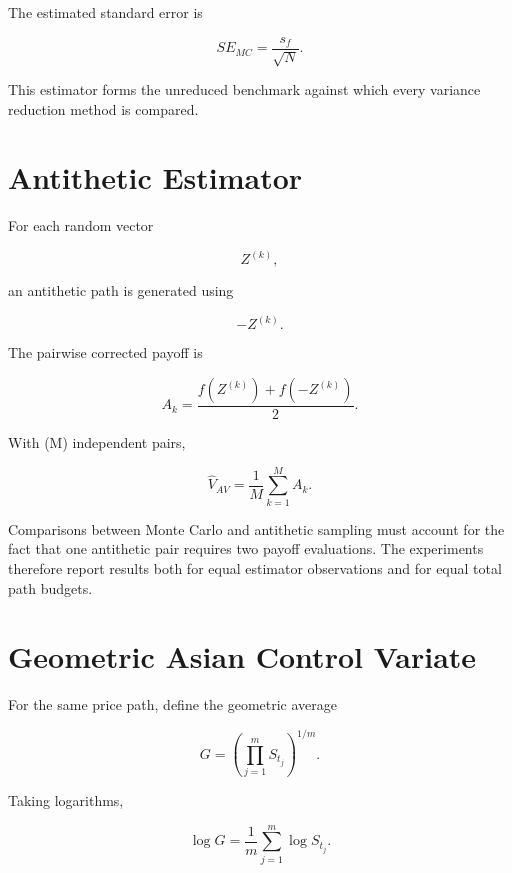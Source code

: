 \documentclass[12pt,a4paper]{report}
\begin{document}
The estimated standard error is

\begin{equation}
SE_{MC}
=
\frac{s_f}{\sqrt{N}}.
\end{equation}

This estimator forms the unreduced benchmark against which every variance reduction method is compared.

\section{Antithetic Estimator}

For each random vector

\begin{equation}
Z^{(k)},
\end{equation}

an antithetic path is generated using

\begin{equation}
-Z^{(k)}.
\end{equation}

The pairwise corrected payoff is

\begin{equation}
A_k
=
\frac{
f(Z^{(k)})
+
f(-Z^{(k)})
}{2}.
\end{equation}

With (M) independent pairs,

\begin{equation}
\widehat V_{AV}
=
\frac{1}{M}
\sum_{k=1}^{M}
A_k.
\end{equation}

Comparisons between Monte Carlo and antithetic sampling must account for the fact that one antithetic pair requires two payoff evaluations. The experiments therefore report results both for equal estimator observations and for equal total path budgets.

\section{Geometric Asian Control Variate}

For the same price path, define the geometric average

\begin{equation}
G
=
\left(
\prod_{j=1}^{m}
S_{t_j}
\right)^{1/m}.
\end{equation}

Taking logarithms,

\begin{equation}
\log G
=
\frac{1}{m}
\sum_{j=1}^{m}
\log S_{t_j}.
\end{equation}
\end{document}
